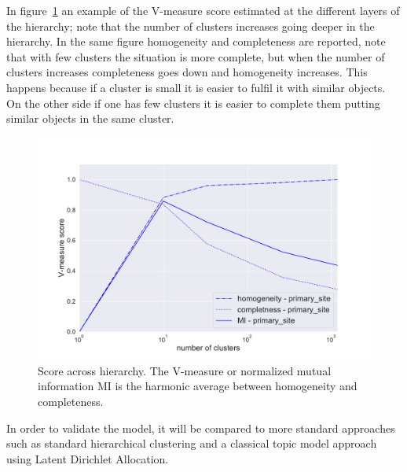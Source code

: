 In figure~\ref{fig:topic/metric_scores_primarysite} an example of the V-measure score estimated at the different layers of the hierarchy; note that the number of clusters increases going deeper in the hierarchy. In the same figure homogeneity and completeness are reported, note that with few clusters the situation is more complete, but when the number of clusters increases completeness goes down and homogeneity increases. This happens because if a cluster is small it is easier to fulfil it with similar objects. On the other side if one has few clusters it is easier to complete them putting similar objects in the same cluster.
\begin{figure}[htb!]
    \centering
    \includegraphics[width=0.8\linewidth]{pictures/topic/gtex/oversigma_10tissue/metric_scores_primarysite.pdf}
    \caption{Score across hierarchy. The V-measure or normalized mutual information MI is the harmonic average between homogeneity and completeness.}
    \label{fig:topic/metric_scores_primarysite}
\end{figure}

In order to validate the model, it will be compared to more standard approaches such as standard hierarchical clustering and a classical topic model approach using Latent Dirichlet Allocation. 
\FloatBarrier